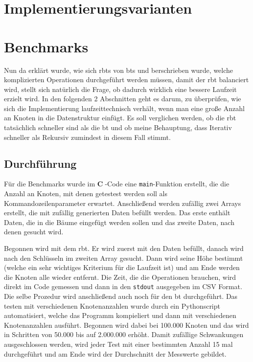 \documentclass[11pt]{article}
\newcommand{\lstin}[1]{\lstinline[language=C]{#1}}
\newcommand{\cpl}{\textbf{C}$\;$}
\begin{document}
\section{Implementierungsvarianten}

\pagebreak
\section{Benchmarks}

Nun da erklärt wurde, wie sich \glspl{rbt} von \glspl{bt} und berschrieben wurde, welche komplizierten Operationen durchgeführt werden müssen, damit der \gls{rbt} balanciert wird,
stellt sich natürlich die Frage, ob dadurch wirklich eine bessere Laufzeit erzielt wird.
In den folgenden 2 Abschnitten geht es darum, zu überprüfen, wie sich die Implementierung laufzeittechnisch verhält, wenn man eine große Anzahl an Knoten in die Datenstruktur einfügt.
Es soll verglichen werden, ob die \gls{rbt} tatsächlich schneller sind als die \gls{bt} und ob meine Behauptung, dass Iterativ schneller als Rekursiv zumindest in diesem Fall stimmt. 

\subsection{Durchführung}
Für die Benchmarks wurde im \cpl-Code eine \lstin{main}-Funktion erstellt, die die Anzahl an Knoten, mit denen getestest werden soll als Kommandozeilenparameter erwartet.
Anschließend werden zufällig zwei Arrays erstellt, die mit zufällig generierten Daten befüllt werden. Das erste enthält Daten, die in die Bäume eingefügt werden sollen und das zweite Daten, nach denen gesucht wird.

Begonnen wird mit dem \gls{rbt}. Er wird zuerst mit den Daten befüllt, danach wird nach den Schlüsseln im zweiten Array gesucht. Dann wird seine Höhe bestimmt (welche ein sehr wichtiges Kriterium für die Laufzeit ist) und am Ende werden die Knoten alle wieder entfernt.  
Die Zeit, die die Operationen brauchen, wird direkt im Code gemessen und dann in den \lstin{stdout} ausgegeben im CSV Format. Die selbe Prozedur wird anschließend auch noch für den \gls{bt} durchgeführt.
Das testen mit verschiedenen Knotenanzahlen wurde durch ein Pythonscript automatisiert, welche das Programm kompieliert und dann mit verschiedenen Knotenanzahlen ausführt. 
Begonnen wird dabei bei 100.000 Knoten und das wird in Schritten von 50.000 bis auf 2.000.000 erhöht. Damit zufällige Schwankungen ausgeschlossen werden, wird jeder Test mit einer bestimmten Anzahl 
15 mal durchgeführt und am Ende wird der Durchschnitt der Messwerte gebildet. 
\end{document}
